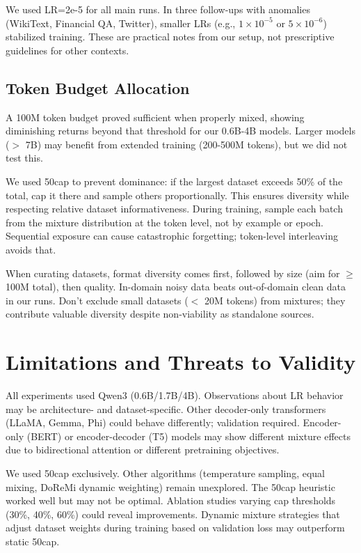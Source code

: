 We used LR=2e-5 for all main runs. In three follow-ups with anomalies (WikiText, Financial QA, Twitter), smaller LRs (e.g., $1\times10^{-5}$ or $5\times10^{-6}$) stabilized training. These are practical notes from our setup, not prescriptive guidelines for other contexts.

\subsection{Token Budget Allocation}

A 100M token budget proved sufficient when properly mixed, showing diminishing returns beyond that threshold for our 0.6B-4B models. Larger models ($>$ 7B) may benefit from extended training (200-500M tokens), but we did not test this.

We used 50cap to prevent dominance: if the largest dataset exceeds 50\% of the total, cap it there and sample others proportionally. This ensures diversity while respecting relative dataset informativeness. During training, sample each batch from the mixture distribution at the token level, not by example or epoch. Sequential exposure can cause catastrophic forgetting; token-level interleaving avoids that.

When curating datasets, format diversity comes first, followed by size (aim for $\geq$ 100M total), then quality. In-domain noisy data beats out-of-domain clean data in our runs. Don't exclude small datasets ($<$ 20M tokens) from mixtures; they contribute valuable diversity despite non-viability as standalone sources.

\section{Limitations and Threats to Validity}

All experiments used Qwen3 (0.6B/1.7B/4B). Observations about LR behavior may be architecture- and dataset-specific. Other decoder-only transformers (LLaMA, Gemma, Phi) could behave differently; validation required. Encoder-only (BERT) or encoder-decoder (T5) models may show different mixture effects due to bidirectional attention or different pretraining objectives.

We used 50cap exclusively. Other algorithms (temperature sampling, equal mixing, DoReMi dynamic weighting) remain unexplored. The 50cap heuristic worked well but may not be optimal. Ablation studies varying cap thresholds (30\%, 40\%, 60\%) could reveal improvements. Dynamic mixture strategies that adjust dataset weights during training based on validation loss may outperform static 50cap.

